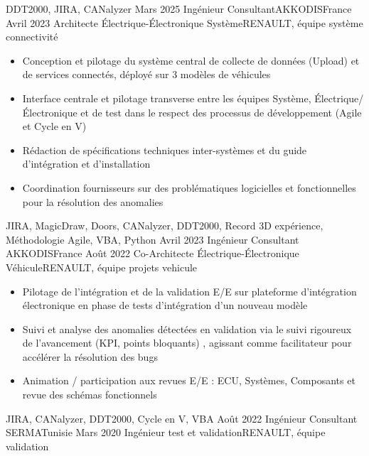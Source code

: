 \begin{experiences}
{\begin{itemize}
                      \end{itemize}
                    }
                    {DDT2000, JIRA, CANalyzer}
  \emptySeparator
  \consultantexperience
    {Mars 2025} {Ingénieur Consultant}{AKKODIS}{France}
    {Avril 2023} {Architecte Électrique-Électronique Système}{RENAULT, équipe système connectivité}
    {
                      \begin{itemize}
                        \item Conception et pilotage du système central de collecte de données (Upload) et de services connectés, déployé sur 3 modèles de véhicules                     
                        \item Interface centrale et pilotage transverse entre les équipes Système, Électrique/Électronique et de test dans le respect des processus de développement (Agile et Cycle en V)                        
                        \item Rédaction de spécifications techniques inter-systèmes et du guide d'intégration et d'installation  
                      \item Coordination fournisseurs sur des problématiques logicielles et fonctionnelles pour la résolution des anomalies                                                                     
                      \end{itemize}
                    }
                    {JIRA, MagicDraw, Doors, CANalyzer, DDT2000, Record 3D expérience, Méthodologie Agile, VBA, Python}
  \emptySeparator
  \consultantexperience
    {Avril 2023}     {Ingénieur Consultant }{AKKODIS}{France}
    {Août 2022}    {Co-Architecte Électrique-Électronique Véhicule}{RENAULT, équipe projets vehicule}{
                      \begin{itemize}
                        \item Pilotage de l'intégration et de la validation E/E sur plateforme d'intégration électronique en phase de tests d'intégration d'un nouveau modèle
                        \item Suivi et analyse des anomalies détectées en validation via le suivi rigoureux de l'avancement (KPI, points bloquants) , agissant comme facilitateur pour accélérer la résolution des bugs                
                        \item Animation / participation aux revues E/E : ECU, Systèmes, Composants et revue des schémas fonctionnels                   
                    
                      \end{itemize}
                    }
                    {JIRA, CANalyzer, DDT2000, Cycle en V, VBA}
  \emptySeparator
  \consultantexperience
  {Août 2022}       {Ingénieur Consultant }{SERMA}{Tunisie}
  {Mars 2020}      {Ingénieur test et validation}{RENAULT, équipe validation}{
                    
}
\end{experiences}
